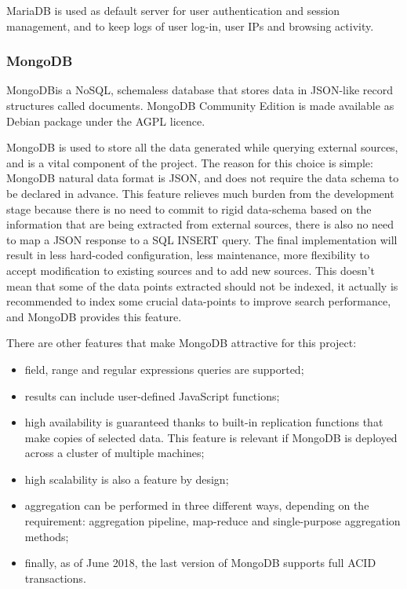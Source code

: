 MariaDB is used as default server for user authentication and session
management, and to keep logs of user log-in, user IPs and browsing activity.


\subsubsection{MongoDB}

MongoDB\texttrademark is a NoSQL, schemaless database that stores data in
JSON-like record structures called documents. MongoDB Community Edition is made
available as Debian package under the AGPL licence.

MongoDB is used to store all the data generated while querying external
sources, and is a vital component of the project. The reason for this choice is
simple: MongoDB natural data format is JSON, and does not require the
data schema to be declared in advance. This feature relieves much burden from
the development stage because there is no need to commit to rigid data-schema
based on the information that are being extracted from external sources, there is
also no need to map a JSON response to a SQL INSERT query. The final
implementation will result in less hard-coded configuration, less maintenance,
more flexibility to accept modification to existing sources and to add new
sources. This doesn't mean that some of the data points extracted should not be
indexed, it actually is recommended to index some crucial data-points to improve
search performance, and MongoDB provides this feature.

There are other features that make MongoDB attractive for this project:
\begin{itemize}
  \item field, range and regular expressions queries are supported;
  \item results can include user-defined JavaScript functions;
  \item high availability is guaranteed thanks to built-in replication functions
  that make copies of selected data. This feature is relevant if MongoDB is
  deployed across a cluster of multiple machines;
  \item high scalability is also a feature by design;
  \item aggregation can be performed in three different ways, depending on the
  requirement: aggregation pipeline, map-reduce and single-purpose aggregation
  methods;
  \item finally, as of June 2018, the last version of MongoDB supports full ACID
  transactions.
\end{itemize}

